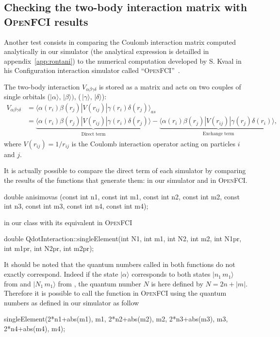 \subsection{Checking the two-body interaction matrix with \textsc{OpenFCI} results}
\label{sec:checkDirectTerm}
Another test consists in comparing the Coulomb interaction matrix computed analytically in our simulator (the analytical expression is detailled in appendix~\ref{app:rontani}) to the numerical computation developed by S. Kvaal in his Configuration interaction simulator called ``\textsc{OpenFCI}''~\cite{Kvaal2008}.

The two-body interaction $V_{\alpha \beta \gamma \delta}$ is stored as a matrix and acts on two couples of single orbitals ($| \alpha \rangle, \, | \beta \rangle)$, ($\, | \gamma \rangle, \, | \delta \rangle$):
\begin{align*}
 V_{\alpha \beta \gamma \delta} &= \langle \alpha (r_i) \beta (r_j) | V(r_{ij}) | \gamma(r_i) \delta(r_j) \rangle_{as}\\
&= \underbrace{\langle \alpha (r_i) \beta (r_j) |V(r_{ij})| \gamma(r_i) \delta(r_j) \rangle}_{\begin{smallmatrix}
  \text{Direct term}
\end{smallmatrix}} - \underbrace{\langle \alpha (r_i) \beta (r_j) |V(r_{ij})| \gamma(r_j) \delta(r_i) \rangle,}_{\begin{smallmatrix}
  \text{Exchange term}
\end{smallmatrix}}
\end{align*}
where $V(r_{ij})=1/r_{ij}$ is the Coulomb interaction operator acting on particles $i$ and $j$.

It is actually possible to compare the direct term of each simulator by comparing the results of the functions that generate them:  in our simulator and  in \textsc{OpenFCI}.
\begin{src}
double anisimovas (const int n1, const int m1, const int n2, const int m2, 
                   const int n3, const int m3, const int n4, const int m4);
\end{src} in our class  with its equivalent in \textsc{OpenFCI}
\begin{src}
double QdotInteraction::singleElement(int N1, int m1, int N2, int m2,
                                      int N1pr, int m1pr, int N2pr, int m2pr);
\end{src}
It should be noted that the quantum numbers called in both functions do not exactly correspond. Indeed if the state $| \alpha \rangle$ corresponds to both states $| n_1\,m_1\rangle$ from  and $| N_1\,m_1\rangle$ from , the quantum number $N$ is here defined by $N=2n+|m|$. Therefore it is possible to call the function in \textsc{OpenFCI} using the quantum numbers as defined in our simulator as follow
\begin{src}
singleElement(2*n1+abs(m1), m1, 2*n2+abs(m2), m2,
              2*n3+abs(m3), m3, 2*n4+abs(m4), m4);
\end{src}

